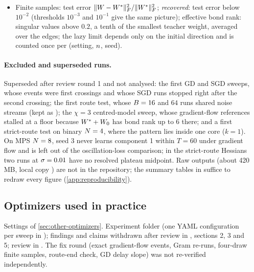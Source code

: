 \begin{itemize}
    squares of $\ln{\rm sd}(\tev1)$ against $\ln(\lr/\batch)$. Collapse law: weighted least squares (weights
    $1/{\rm s.e.}^2$) of $T_{\rm SGD}/T_{\rm GF}$ over the 19 conditions in which every run escaped, one $c_{\rm col}$
    per law; \emph{stalled}: no persistent event by $4T_{\rm GF}$ (the route amplitude decays, \cref{prop:A-sgd-collapse};
    called trapped in the code).
  \item Finite samples: test error $\lVert W-W^{*}\rVert_{F}^2/\lVert W^{*}\rVert_{F}^2$; \emph{recovered}: test error below
    $10^{-2}$ (thresholds $10^{-3}$ and $10^{-1}$ give the same picture); effective bond rank: singular values
    above $0.2$, a tenth of the smallest teacher weight, averaged over the edges; the lazy limit depends
    only on the initial direction and is counted once per (setting, $n$, seed).
\end{itemize}

\paragraph{Excluded and superseded runs.}
Superseded after review round 1 and not analysed: the first GD and SGD sweeps, whose events were first
crossings and whose SGD runs stopped right after the second crossing; the first route test, whose
$B=16$ and $64$ runs shared noise streams (kept as ); the $\chi=3$
centred-model sweep, whose gradient-flow references stalled at a floor because $W^{*}+W_{0}$ has bond rank up to 6
there; and a first strict-route test on binary $N=4$, where the pattern lies inside one core ($k=1$). On
MPS $N=8$, seed 3 never learns component 1 within $T=60$ under gradient flow and is left out of the
oscillation-loss comparison; in the strict-route Hessians two runs at $\sigma=0.01$ have no resolved plateau
midpoint. Raw outputs (about 420\,MB, local copy ) are not in the repository;
the summary tables in  suffice to redraw every figure (\cref{app:reproducibility}).

\subsection{Optimizers used in practice}\label{app:exp-optimizers}
Settings of \cref{sec:other-optimizers}. Experiment folder  (one YAML
configuration per sweep in ); findings and claims withdrawn after review in
, sections 2, 3 and 5; review in . The fix round
(exact gradient-flow events, Gram re-runs, four-draw finite samples, route-end check, GD delay slope) was not
re-verified independently.

